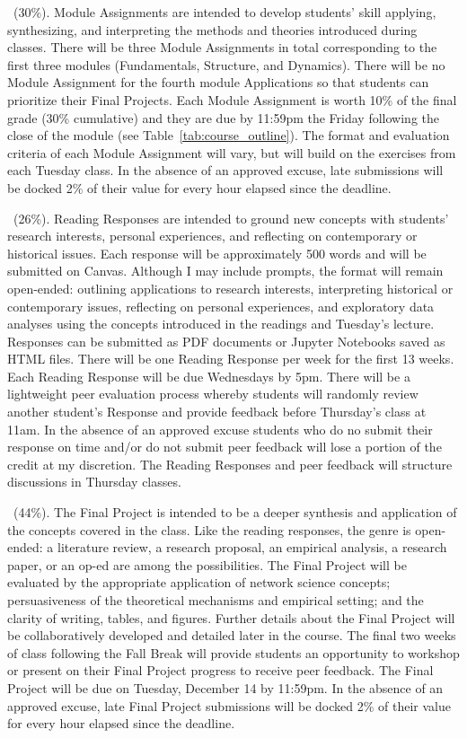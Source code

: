 \documentclass[11pt]{memoir}
\begin{document}
    \begin{description}[itemsep=.5em,labelindent=1em]
        \item[Module Assignments]~(30\%). Module Assignments are intended to develop students' skill applying, synthesizing, and interpreting the methods and theories introduced during classes. There will be three Module Assignments in total corresponding to the first three modules (Fundamentals, Structure, and Dynamics). There will be no Module Assignment for the fourth module Applications so that students can prioritize their Final Projects. Each Module Assignment is worth 10\% of the final grade (30\% cumulative) and they are due by 11:59pm the Friday following the close of the module (see Table~\ref{tab:course_outline}). The format and evaluation criteria of each Module Assignment will vary, but will build on the exercises from each Tuesday class. In the absence of an approved excuse, late submissions will be docked 2\% of their value for every hour elapsed since the deadline.
        \item[Reading Responses.]~(26\%). Reading Responses are intended to ground new concepts with students' research interests, personal experiences, and reflecting on contemporary or historical issues. Each response will be approximately 500 words and will be submitted on Canvas. Although I may include prompts, the format will remain open-ended: outlining applications to research interests, interpreting historical or contemporary issues, reflecting on personal experiences, and exploratory data analyses using the concepts introduced in the readings and Tuesday's lecture. Responses can be submitted as PDF documents or Jupyter Notebooks saved as HTML files. There will be one Reading Response per week for the first 13 weeks. Each Reading Response will be due Wednesdays by 5pm. There will be a lightweight peer evaluation process whereby students will randomly review another student's Response and provide feedback before Thursday's class at 11am. In the absence of an approved excuse students who do no submit their response on time and/or do not submit peer feedback will lose a portion of the credit at my discretion. The Reading Responses and peer feedback will structure discussions in Thursday classes.
        \item[Final Project]~(44\%). The Final Project is intended to be a deeper synthesis and application of the concepts covered in the class. Like the reading responses, the genre is open-ended: a literature review, a research proposal, an empirical analysis, a research paper, or an op-ed are among the possibilities. The Final Project will be evaluated by the appropriate application of network science concepts; persuasiveness of the theoretical mechanisms and empirical setting; and the clarity of writing, tables, and figures. Further details about the Final Project will be collaboratively developed and detailed later in the course. The final two weeks of class following the Fall Break will provide students an opportunity to workshop or present on their Final Project progress to receive peer feedback. The Final Project will be due on Tuesday, December 14 by 11:59pm. In the absence of an approved excuse, late Final Project submissions will be docked 2\% of their value for every hour elapsed since the deadline.

\end{description}
\end{document}
